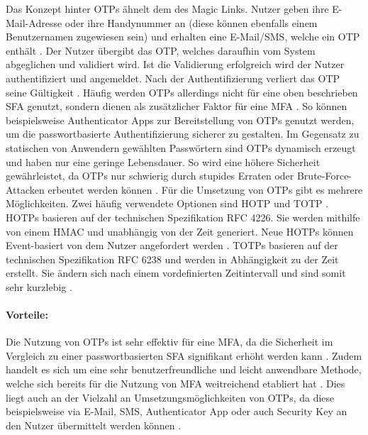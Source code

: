Das Konzept hinter \ac{OTP}s ähnelt dem des Magic Links. Nutzer geben ihre E-Mail-Adresse oder ihre Handynummer an (diese können ebenfalls einem Benutzernamen zugewiesen sein) und erhalten eine E-Mail/SMS, welche ein \ac{OTP} enthält \cite{chowhan2019password} \cite{parmar2022comprehensive}. 
Der Nutzer übergibt das \ac{OTP}, welches daraufhin vom System abgeglichen und validiert wird. Ist die Validierung erfolgreich wird der Nutzer authentifiziert und angemeldet. Nach der Authentifizierung verliert das \ac{OTP} seine Gültigkeit \cite{chowhan2019password}.
Häufig werden \ac{OTP}s allerdings nicht für eine oben beschrieben \ac{SFA} genutzt, sondern dienen als zusätzlicher Faktor für eine \ac{MFA} \cite{chowhan2019password}. So können beispielsweise Authenticator Apps zur Bereitstellung von \ac{OTP}s genutzt werden, um die passwortbasierte Authentifizierung sicherer zu gestalten.
Im Gegensatz zu statischen von Anwendern gewählten
Passwörtern sind \ac{OTP}s dynamisch erzeugt und haben nur
eine geringe Lebensdauer. So wird eine höhere
Sicherheit gewährleistet, da \ac{OTP}s nur schwierig durch
stupides Erraten oder Brute-Force-Attacken erbeutet
werden können \cite{chowhan2019password}.
Für die Umsetzung von \ac{OTP}s gibt es mehrere Möglichkeiten. Zwei häufig verwendete Optionen sind \ac{HOTP} und \ac{TOTP} \cite{chowhan2019password}.
\ac{HOTP}s basieren auf der technischen Spezifikation RFC 4226. Sie werden mithilfe von einem \ac{HMAC} und unabhängig von der Zeit generiert. Neue \ac{HOTP}s können Event-basiert von dem Nutzer angefordert werden \cite{chowhan2019password}.
\ac{TOTP}s basieren auf der technischen Spezifikation RFC 6238 und werden in Abhängigkeit zu der Zeit erstellt. Sie ändern sich nach einem vordefinierten Zeitintervall und sind somit sehr kurzlebig \cite{chowhan2019password}.

\paragraph*{Vorteile:} Die Nutzung von \ac{OTP}s ist sehr effektiv für eine \ac{MFA}, da die Sicherheit im Vergleich zu einer passwortbasierten \ac{SFA} signifikant erhöht werden kann \cite{chowhan2019password} \cite{parmar2022comprehensive}. Zudem handelt es sich um eine sehr benutzerfreundliche und leicht anwendbare Methode, welche sich bereits für die Nutzung von \ac{MFA} weitreichend etabliert hat \cite{parmar2022comprehensive}. Dies liegt auch an der Vielzahl an Umsetzungsmöglichkeiten von \ac{OTP}s, da diese beispielsweise via E-Mail, SMS, Authenticator App oder auch Security Key an den Nutzer übermittelt werden können \cite{chowhan2019password} \cite{parmar2022comprehensive}. 

